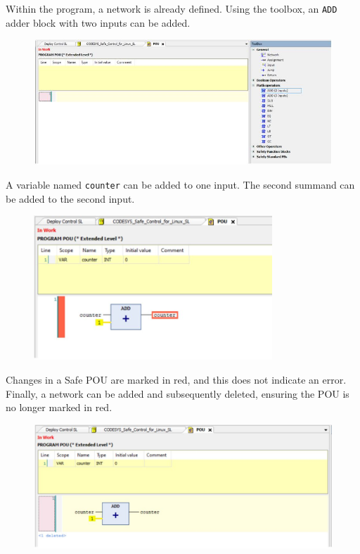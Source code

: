 \documentclass[a4paper,12pt]{article}
\begin{document}
Within the program, a network is already defined. Using the toolbox, an \texttt{ADD} adder block with two inputs can be added.
\begin{figure}[H]
	\centering
	\includegraphics[width=1\textwidth]{e3.JPG}
\end{figure}
A variable named \texttt{counter} can be added to one input. The second summand can be added to the second input.
\begin{figure}[H]
	\centering
	\includegraphics[width=0.8\textwidth]{e4.JPG}
\end{figure}
Changes in a Safe POU are marked in red, and this does not indicate an error.
Finally, a network can be added and subsequently deleted, ensuring the POU is no longer marked in red.
\begin{figure}[H]
	\centering
	\includegraphics[width=1\textwidth]{e5.JPG}
\end{figure}
\end{document}
